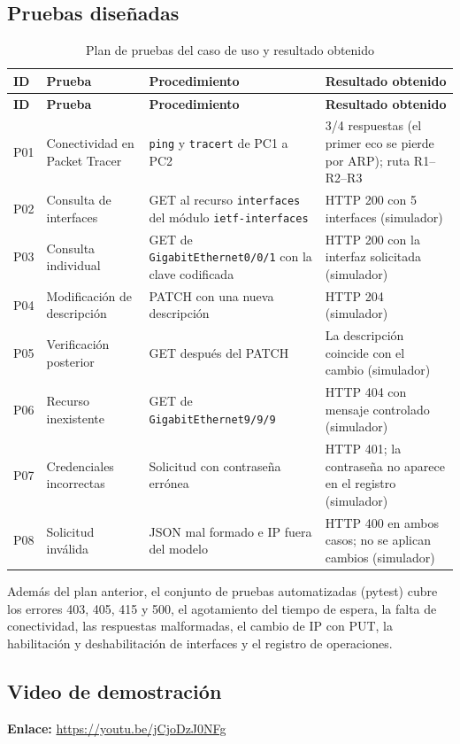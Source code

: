 \subsection{Pruebas diseñadas}
\begin{longtable}{p{0.8cm}p{3.6cm}p{4.4cm}p{4.6cm}}
\caption{Plan de pruebas del caso de uso y resultado obtenido}\label{tab:pruebas}\\
\toprule
\textbf{ID} & \textbf{Prueba} & \textbf{Procedimiento} & \textbf{Resultado obtenido} \\
\midrule
\endfirsthead
\toprule
\textbf{ID} & \textbf{Prueba} & \textbf{Procedimiento} & \textbf{Resultado obtenido} \\
\midrule
\endhead
P01 & Conectividad en Packet Tracer & \texttt{ping} y \texttt{tracert} de PC1 a PC2 & 3/4 respuestas (el primer eco se pierde por ARP); ruta R1--R2--R3 \\
P02 & Consulta de interfaces & GET al recurso \texttt{interfaces} del módulo \texttt{ietf-interfaces} & HTTP 200 con 5 interfaces (simulador) \\
P03 & Consulta individual & GET de \texttt{GigabitEthernet0/0/1} con la clave codificada & HTTP 200 con la interfaz solicitada (simulador) \\
P04 & Modificación de descripción & PATCH con una nueva descripción & HTTP 204 (simulador) \\
P05 & Verificación posterior & GET después del PATCH & La descripción coincide con el cambio (simulador) \\
P06 & Recurso inexistente & GET de \texttt{GigabitEthernet9/9/9} & HTTP 404 con mensaje controlado (simulador) \\
P07 & Credenciales incorrectas & Solicitud con contraseña errónea & HTTP 401; la contraseña no aparece en el registro (simulador) \\
P08 & Solicitud inválida & JSON mal formado e IP fuera del modelo & HTTP 400 en ambos casos; no se aplican cambios (simulador) \\
\bottomrule
\end{longtable}

Además del plan anterior, el conjunto de pruebas automatizadas (pytest) cubre los errores 403, 405, 415 y 500, el agotamiento del tiempo de espera, la falta de conectividad, las respuestas malformadas, el cambio de IP con PUT, la habilitación y deshabilitación de interfaces y el registro de operaciones.

\subsection{Video de demostración}
\textbf{Enlace:} \url{https://youtu.be/jCjoDzJ0NFg}

